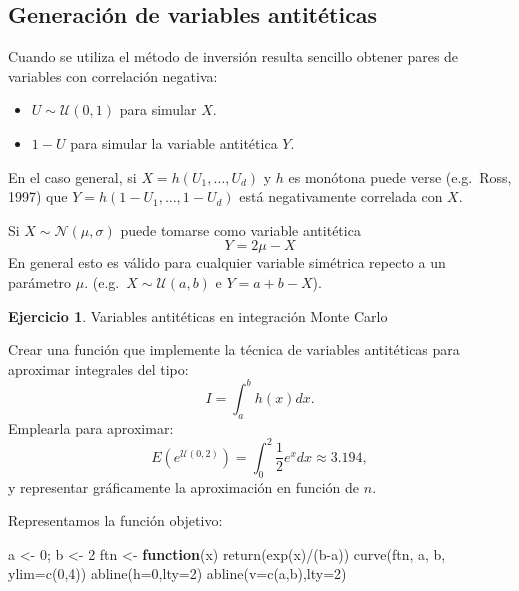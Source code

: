 \documentclass[
]{book}
\newenvironment{Shaded}{\begin{snugshade}}{\end{snugshade}}
\newcommand{\AttributeTok}[1]{\textcolor[rgb]{0.77,0.63,0.00}{#1}}
\newcommand{\ControlFlowTok}[1]{\textcolor[rgb]{0.13,0.29,0.53}{\textbf{#1}}}
\newcommand{\DecValTok}[1]{\textcolor[rgb]{0.00,0.00,0.81}{#1}}
\newcommand{\FunctionTok}[1]{\textcolor[rgb]{0.00,0.00,0.00}{#1}}
\newcommand{\NormalTok}[1]{#1}
\newcommand{\OtherTok}[1]{\textcolor[rgb]{0.56,0.35,0.01}{#1}}
\newcommand{\SpecialCharTok}[1]{\textcolor[rgb]{0.00,0.00,0.00}{#1}}
\theoremstyle{break}
\theoremstyle{definition}
\theoremstyle{definition}
\theoremstyle{definition}
\newtheorem{exercise}{Ejercicio}[chapter]
\theoremstyle{definition}
\theoremstyle{remark}
\begin{document}
\hypertarget{generaciuxf3n-de-variables-antituxe9ticas}{%
\subsection{Generación de variables antitéticas}\label{generaciuxf3n-de-variables-antituxe9ticas}}

Cuando se utiliza el método de inversión resulta sencillo obtener
pares de variables con correlación negativa:

\begin{itemize}
\item
  \(U\sim \mathcal{U}\left( 0,1\right)\) para simular \(X\).
\item
  \(1-U\) para simular la variable antitética \(Y\).
\end{itemize}

En el caso general, si \(X=h\left( U_{1},\ldots,U_{d}\right)\) y
\(h\) es monótona puede verse (e.g.~Ross, 1997) que
\(Y=h\left( 1-U_{1},\ldots,1-U_{d}\right)\) está negativamente
correlada con \(X\).

Si \(X\sim \mathcal{N}(\mu,\sigma)\) puede tomarse como variable
antitética \[Y=2\mu-X\]
En general esto es válido para cualquier variable
simétrica repecto a un parámetro \(\mu\).
(e.g.~\(X\sim \mathcal{U}(a,b)\) e \(Y=a+b-X\)).

\begin{exercise}
\protect\hypertarget{exr:mc-integrala}{}{\label{exr:mc-integrala} }Variables antitéticas en integración Monte Carlo
\end{exercise}

Crear una función que implemente la técnica de variables antitéticas para aproximar integrales del tipo:
\[I=\int_{a}^{b}h\left(  x\right)  dx.\]
Emplearla para aproximar:
\[E\left(  e^{\mathcal{U}(0,2)}\right)  =\int_{0}^{2}\frac{1}{2}e^{x}dx\approx3.194,\label{integralmc}\]
y representar gráficamente la aproximación en función de \(n\).

Representamos la función objetivo:

\begin{Shaded}
\begin{Highlighting}[]
\NormalTok{a }\OtherTok{\textless{}{-}} \DecValTok{0}\NormalTok{; b }\OtherTok{\textless{}{-}} \DecValTok{2}
\NormalTok{ftn }\OtherTok{\textless{}{-}} \ControlFlowTok{function}\NormalTok{(x) }\FunctionTok{return}\NormalTok{(}\FunctionTok{exp}\NormalTok{(x)}\SpecialCharTok{/}\NormalTok{(b}\SpecialCharTok{{-}}\NormalTok{a))}
\FunctionTok{curve}\NormalTok{(ftn, a, b, }\AttributeTok{ylim=}\FunctionTok{c}\NormalTok{(}\DecValTok{0}\NormalTok{,}\DecValTok{4}\NormalTok{))}
\FunctionTok{abline}\NormalTok{(}\AttributeTok{h=}\DecValTok{0}\NormalTok{,}\AttributeTok{lty=}\DecValTok{2}\NormalTok{)}
\FunctionTok{abline}\NormalTok{(}\AttributeTok{v=}\FunctionTok{c}\NormalTok{(a,b),}\AttributeTok{lty=}\DecValTok{2}\NormalTok{)}
\end{Highlighting}
\end{Shaded}
\end{document}
